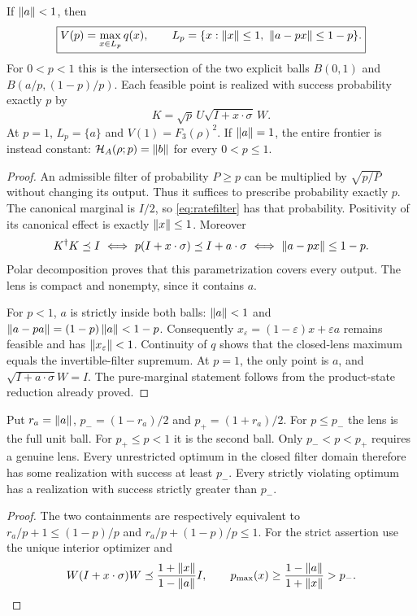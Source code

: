 \begin{theorem}\label{thm:lens}
If $\left\lVert a\right\rVert<1$, then
\begin{equation}\label{eq:lens}\boxed{
 V(p)=\max_{x\in L_p}q(x),\qquad
 L_p=\{x:\left\lVert x\right\rVert\leq1,\ \left\lVert a-px\right\rVert\leq1-p\}.}
\end{equation}
For $0<p<1$ this is the intersection of the two explicit balls
$B(0,1)$ and $B(a/p,(1-p)/p)$. Each feasible point is realized with
success probability exactly $p$ by
\begin{equation}\label{eq:ratefilter}
 K=\sqrt p\,U\sqrt{I+x\cdot\sigma}\,W.
\end{equation}
At $p=1$, $L_p=\{a\}$ and $V(1)=F_3(\rho)^2$.
If $\left\lVert a\right\rVert=1$, the entire frontier is instead constant:
$\mathcal H_A(\rho;p)=\left\lVert b\right\rVert$ for every $0<p\leq1$.
\end{theorem}
\begin{proof}
An admissible filter of probability $P\geq p$ can be multiplied by
$\sqrt{p/P}$ without changing its output. Thus it suffices to prescribe
probability exactly $p$. The canonical marginal is $I/2$, so
\eqref{eq:ratefilter} has that probability. Positivity of its canonical
effect is exactly $\left\lVert x\right\rVert\leq1$. Moreover
\[
 K^\dagger K\preceq I
 \ \Longleftrightarrow\ p(I+x\cdot\sigma)\preceq I+a\cdot\sigma
 \ \Longleftrightarrow\ \left\lVert a-px\right\rVert\leq1-p.
\]
Polar decomposition proves that this parametrization covers every output.
The lens is compact and nonempty, since it contains $a$.

For $p<1$, $a$ is strictly inside both balls: $\left\lVert a\right\rVert<1$ and
$\left\lVert a-pa\right\rVert=(1-p)\left\lVert a\right\rVert<1-p$. Consequently
$x_\varepsilon=(1-\varepsilon)x+\varepsilon a$ remains feasible and has
$\left\lVert x_\varepsilon\right\rVert<1$. Continuity of $q$ shows that the closed-lens
maximum equals the invertible-filter supremum. At $p=1$, the only point
is $a$, and $\sqrt{I+a\cdot\sigma}W=I$. The pure-marginal statement
follows from the product-state reduction already proved.
\end{proof}

\begin{corollary}
\label{cor:regimes}
Put $r_a=\left\lVert a\right\rVert$, $p_-=(1-r_a)/2$ and $p_+=(1+r_a)/2$.
For $p\leq p_-$ the lens is the full unit ball. For $p_+\leq p<1$
it is the second ball. Only $p_-<p<p_+$ requires a genuine lens.
Every unrestricted optimum in the closed filter domain therefore has
some realization with success at least $p_-$. Every strictly violating
optimum has a realization with success strictly greater than $p_-$.
\end{corollary}
\begin{proof}
The two containments are respectively equivalent to
$r_a/p+1\leq(1-p)/p$ and
$r_a/p+(1-p)/p\leq1$. For the strict assertion use the unique interior
optimizer and
\[
 W(I+x\cdot\sigma)W\preceq
   \frac{1+\left\lVert x\right\rVert}{1-\left\lVert a\right\rVert}I,
 \qquad p_{\max}(x)\geq\frac{1-\left\lVert a\right\rVert}{1+\left\lVert x\right\rVert}>p_-.
\]
\end{proof}

